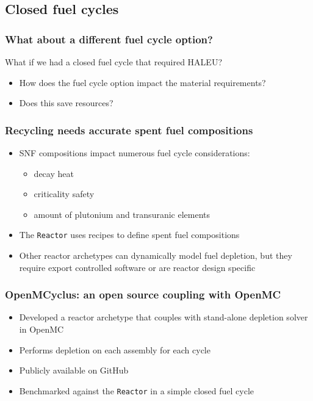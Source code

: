 \subsection{Closed fuel cycles}
\begin{frame}
    \frametitle{What about a different fuel cycle option?}
    What if we had a closed fuel cycle that required \gls{HALEU}?
    \begin{itemize}
        \item How does the fuel cycle option impact the material requirements?
        \item Does this save resources?
    \end{itemize}

\end{frame}

\begin{frame}
    \frametitle{Recycling needs accurate spent fuel compositions}
    \begin{itemize}
    \item \gls{SNF} compositions impact numerous fuel cycle considerations:
    \begin{itemize}
        \item decay heat
        \item criticality safety
        \item amount of plutonium and transuranic elements
    \end{itemize}
    \item<2-> The \Cycamore \texttt{Reactor} uses recipes to define spent fuel compositions
    \item<3-> Other \Cyclus reactor archetypes can dynamically model 
          fuel depletion, but they require export controlled software 
          or are reactor design specific
\end{itemize}
\end{frame}

\begin{frame}
    \frametitle{OpenMCyclus: an open source coupling with OpenMC}
    \begin{itemize}
        \item Developed a reactor archetype that couples \Cyclus with 
              stand-alone depletion solver in OpenMC
        \item Performs depletion on each assembly for each cycle
        \item Publicly available on GitHub \cite{bachmann_openmcyclus_2023}
        \item Benchmarked against the \Cycamore \texttt{Reactor} in a 
              simple closed fuel cycle
    \end{itemize}
\end{frame}

